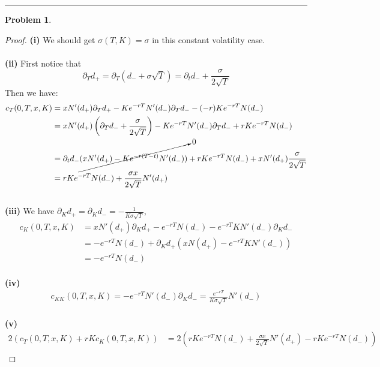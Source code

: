 \documentclass[a4paper, 10pt]{article}
\theoremstyle{definition}
\newtheorem{problem}{Problem}
\theoremstyle{hSol}
\begin{document}
\noindent\rule{16cm}{0.4pt}
\begin{problem} 
\end{problem}
\begin{proof} \textbf{(i)} We should get $\sigma(T,K) = \sigma$ in this constant volatility case.\\
~\\
\textbf{(ii)} First notice that
$$
\partial_T d_+ = \partial_T (d_-+\sigma\sqrt{T}) = \partial_t d_- + \frac{\sigma}{2\sqrt{T}}
$$
Then we have:
\begin{equation}
  \begin{split}
    c_T(0,T,x,K) &= xN'(d_+)\partial_T d_+ - Ke^{-rT}N'(d_-)\partial_T d_- - (-r)Ke^{-rT}N(d_-)\\
    &= xN'(d_+)\left(\partial_T d_- + \frac{\sigma}{2\sqrt{T}}\right) - Ke^{-rT}N'(d_-)\partial_T d_- + rKe^{-rT}N(d_-)\\
    &= \partial_t d_-\cancelto{0}{(xN'(d_+)-Ke^{-r(T-t)}N'(d_-))} +rKe^{-rT}N(d_-)+ xN'(d_+)\frac{\sigma}{2\sqrt{T}} \\
    &=  rKe^{-rT}N(d_-)+ \frac{\sigma x}{2\sqrt{T}} N'(d_+)
  \end{split}
\end{equation}
~\\
\textbf{(iii)} We have $\partial_K d_+ = \partial_K d_- = -\frac{1}{K\sigma\sqrt{T}}$,
\begin{equation}
  \begin{split}
    c_K(0,T,x,K) &=xN'(d_+)\partial_Kd_+ - e^{-rT}N(d_-) - e^{-rT}KN'(d_-) \partial_Kd_- \\
    &=- e^{-rT}N(d_-) + \partial_Kd_+(xN(d_+)-e^{-rT}KN'(d_-)) \\
    &=- e^{-rT}N(d_-)
  \end{split}
\end{equation}
~\\
\textbf{(iv)}
\begin{equation}
  \begin{split}
    c_{KK}(0,T,x,K) = - e^{-rT}N'(d_-)\partial_K d_- =  \frac{e^{-rT}}{K\sigma\sqrt{T}}N'(d_-)
  \end{split}
\end{equation}
~\\
\textbf{(v)} 
\begin{equation}
  \begin{split}
    2(c_T(0,T,x,K) + rKc_K(0,T,x,K)) &= 2\left(rKe^{-rT}N(d_-)+ \frac{\sigma x}{2\sqrt{T}} N'(d_+)- rKe^{-rT}N(d_-)\right) \\

\end{split}
\end{equation}
\end{proof}
\end{document}
